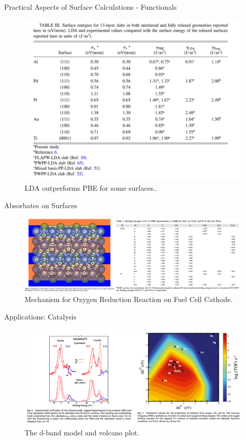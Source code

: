 \documentclass[aspectratio=169]{beamer}
\begin{document}
    \begin{frame}{Practical Aspects of Surface Calculations - Functionals}
        \begin{figure}
            \centering
            \includegraphics[width=0.5\linewidth]{lectures/figures/11_surface_functionals.png}
            \caption{LDA outperforms PBE for some surfaces.\cite{singh-millerSurfaceEnergiesWork2009}.}
        \end{figure}
    \end{frame}

    \begin{frame}{Absorbates on Surfaces}
        \begin{figure}
            \centering
            \includegraphics[width=\linewidth]{lectures/figures/11_binding.png}
            \caption{Mechanism for Oxygen Reduction Reaction on  Fuel Cell Cathode.\cite{shaMechanismOxygenReduction2012}}
        \end{figure}
    \end{frame}


    \begin{frame}{Applications: Catalysis}
        \begin{figure}
            \centering
            \includegraphics[width=0.8\linewidth]{lectures/figures/11_catalysis.png}
            \caption{The d-band model and volcano plot.\cite{norskovSurfaceChemistrySpecial2011}}
        \end{figure}
    \end{frame}
\end{document}
